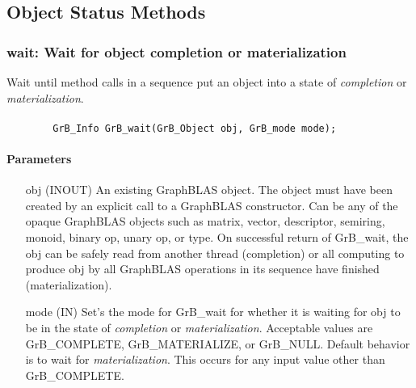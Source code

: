 \subsection{Object Status Methods}
\label{Sec:StatusMethods}

\subsubsection{{\sf wait}: Wait for object completion or materialization}
\label{Sec:GrB_wait}

Wait until method calls in a sequence put an object 
into a state of \emph{completion} or \emph{materialization}.

\paragraph{\syntax}

\begin{verbatim}
        GrB_Info GrB_wait(GrB_Object obj, GrB_mode mode);
\end{verbatim}

\paragraph{Parameters}

\begin{itemize}[leftmargin=1.1in]
        \item[{\sf obj}] ({\sf INOUT}) An existing GraphBLAS object.
        The object must have been created by an explicit call to a
        GraphBLAS constructor.  Can be any of the opaque GraphBLAS
        objects such as matrix, vector, descriptor, semiring, monoid,
        binary op, unary op, or type. On successful return of {\sf
        GrB\_wait}, the {\sf obj} can be safely read from another thread (completion)
        or all computing to produce {\sf obj} by all GraphBLAS operations 
        in its sequence have finished (materialization).   
        
        \item[{\sf mode}] ({\sf IN}) Set's the mode for {\sf GrB\_wait} for whether it is waiting 
        for {\sf obj} to be in the state of \emph{completion} or \emph{materialization}.  Acceptable 
        values are {\sf GrB\_COMPLETE}, {\sf GrB\_MATERIALIZE}, or {\sf GrB\_NULL}.
        Default behavior is to wait for \emph{materialization}.  This occurs for any input
        value other than {\sf GrB\_COMPLETE}.
\end{itemize}

